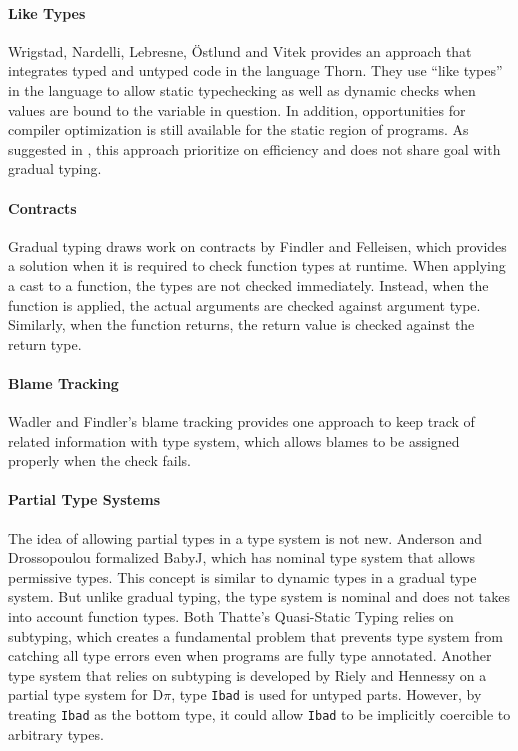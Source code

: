 \paragraph{Like Types}

Wrigstad, Nardelli, Lebresne, {\"O}stlund and Vitek\cite{wrigstad2010integrating}
provides an approach that integrates typed and untyped code
in the language Thorn. They use ``like types'' in the language
to allow static typechecking as well as dynamic checks when
values are bound to the variable in question.
In addition, opportunities for compiler optimization
is still available for the static region of programs.
As suggested in \cite{siek2015refined}, this approach
prioritize on efficiency and does not share goal with gradual typing.

\paragraph{Contracts}

Gradual typing draws work on contracts
by Findler and Felleisen\cite{findler2002contracts,gray2005fine},
which provides a solution when it is required to check function types at runtime.
When applying a cast to a function, the types are not checked immediately.
Instead, when the function is applied, the actual arguments are checked
against argument type. Similarly, when the function returns,
the return value is checked against the return type.

\paragraph{Blame Tracking}

Wadler and Findler's blame tracking\cite{wadler2009well}
provides one approach to keep track of related information with type system,
which allows blames to be assigned properly when the check fails.

\paragraph{Partial Type Systems}
The idea of allowing partial types in a type system is not new.
Anderson and Drossopoulou formalized BabyJ\cite{anderson2003babyj}, which has
nominal type system that allows permissive types.
This concept is similar to dynamic types in a gradual type system.
But unlike gradual typing, the type system is nominal and does not takes into account function types.
Both Thatte's Quasi-Static Typing\cite{thatte1989quasi} relies on subtyping,
which creates a fundamental problem that prevents type system from catching all type errors even when programs are
fully type annotated.
Another type system that relies on subtyping
is developed by Riely and Hennessy\cite{riely1999trust} on a partial type system for D$\pi$,
type \texttt{Ibad} is used for untyped parts. However, by treating \texttt{Ibad} as the bottom type,
it could allow \texttt{Ibad} to be implicitly coercible to arbitrary types.


